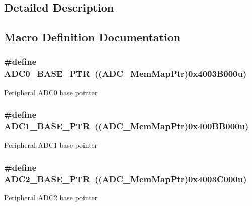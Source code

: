 \subsection{Detailed Description}


\subsection{Macro Definition Documentation}
\hypertarget{group___a_d_c___peripheral_ga6cec2f227a3a37a9fccaa830740f1f5e}{}
\subsubsection[{A\+D\+C0\+\_\+\+B\+A\+S\+E\+\_\+\+P\+T\+R}]{\setlength{\rightskip}{0pt plus 5cm}\#define A\+D\+C0\+\_\+\+B\+A\+S\+E\+\_\+\+P\+T\+R~(({\bf A\+D\+C\+\_\+\+Mem\+Map\+Ptr})0x4003\+B000u)}\label{group___a_d_c___peripheral_ga6cec2f227a3a37a9fccaa830740f1f5e}
Peripheral A\+D\+C0 base pointer \hypertarget{group___a_d_c___peripheral_ga7fb56938ede79eea2065c4294db3b2d3}{}
\subsubsection[{A\+D\+C1\+\_\+\+B\+A\+S\+E\+\_\+\+P\+T\+R}]{\setlength{\rightskip}{0pt plus 5cm}\#define A\+D\+C1\+\_\+\+B\+A\+S\+E\+\_\+\+P\+T\+R~(({\bf A\+D\+C\+\_\+\+Mem\+Map\+Ptr})0x400\+B\+B000u)}\label{group___a_d_c___peripheral_ga7fb56938ede79eea2065c4294db3b2d3}
Peripheral A\+D\+C1 base pointer \hypertarget{group___a_d_c___peripheral_ga13df5f5718b7af0f640ee605db14799e}{}
\subsubsection[{A\+D\+C2\+\_\+\+B\+A\+S\+E\+\_\+\+P\+T\+R}]{\setlength{\rightskip}{0pt plus 5cm}\#define A\+D\+C2\+\_\+\+B\+A\+S\+E\+\_\+\+P\+T\+R~(({\bf A\+D\+C\+\_\+\+Mem\+Map\+Ptr})0x4003\+C000u)}\label{group___a_d_c___peripheral_ga13df5f5718b7af0f640ee605db14799e}
Peripheral A\+D\+C2 base pointer \hypertarget{group___a_d_c___peripheral_gadbd63bcf12f71b0dd3ac6553315dfb0e}{}
